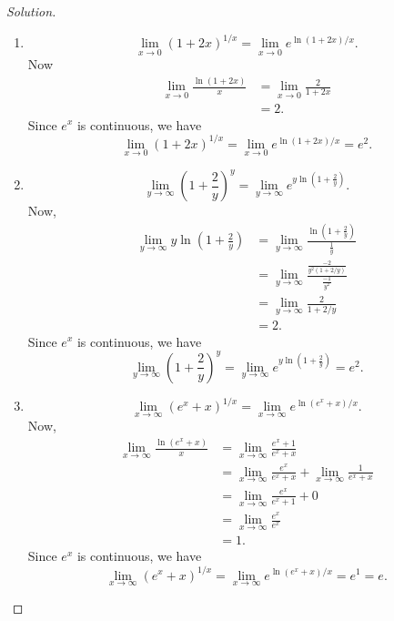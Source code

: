 \documentclass{article}
\begin{document}
\begin{proof}[Solution]\indent
    \begin{enumerate}[label=\textbf{(\alph*)}]
        \item 
        $$\lim_{x\to0}(1+2x)^{1/x} = \lim_{x\to0}e^{\ln(1+2x)/x}.$$
        Now \begin{align*}
            \lim_{x\to0}\frac{\ln(1+2x)}{x} & = \lim_{x\to0}\frac{2}{1+2x} \\
            & = 2.
        \end{align*}
        Since $e^x$ is continuous, we have
        $$\lim_{x\to0}(1+2x)^{1/x} = \lim_{x\to0}e^{\ln(1+2x)/x} = e^2.$$

        \item
        $$\lim_{y\to\infty}(1+\frac{2}{y})^y = \lim_{y\to\infty}e^{y\ln(1+\frac{2}{y})}.$$
        Now, 
        \begin{align*}
            \lim_{y\to\infty}y\ln(1+\frac{2}{y}) & = \lim_{y\to\infty}\frac{\ln(1+\frac{2}{y})}{\frac{1}{y}} \\
            & = \lim_{y\to\infty}\frac{\frac{-2}{y^2(1+2/y)}}{\frac{-1}{y^2}} \\
            & = \lim_{y\to\infty}\frac{2}{1+2/y} \\
            & = 2.
        \end{align*}
        Since $e^x$ is continuous, we have
        $$\lim_{y\to\infty}(1+\frac{2}{y})^y = \lim_{y\to\infty}e^{y\ln(1+\frac{2}{y})} = e^2.$$

        \item
        $$\lim_{x\to\infty}(e^x+x)^{1/x} = \lim_{x\to\infty}e^{\ln(e^x+x)/x}.$$
        Now,
        \begin{align*}
            \lim_{x\to\infty}\frac{\ln(e^x+x)}{x} & = \lim_{x\to\infty}\frac{e^x+1}{e^x+x} \\
            & = \lim_{x\to\infty}\frac{e^x}{e^x+x} + \lim_{x\to\infty}\frac{1}{e^x+x} \\
            & = \lim_{x\to\infty}\frac{e^x}{e^x+1} + 0 \\
            & = \lim_{x\to\infty}\frac{e^x}{e^x} \\
            & = 1.
        \end{align*}
        Since $e^x$ is continuous, we have
        $$\lim_{x\to\infty}(e^x+x)^{1/x} = \lim_{x\to\infty}e^{\ln(e^x+x)/x} = e^1 = e.$$
    \end{enumerate}
\end{proof}
\end{document}
